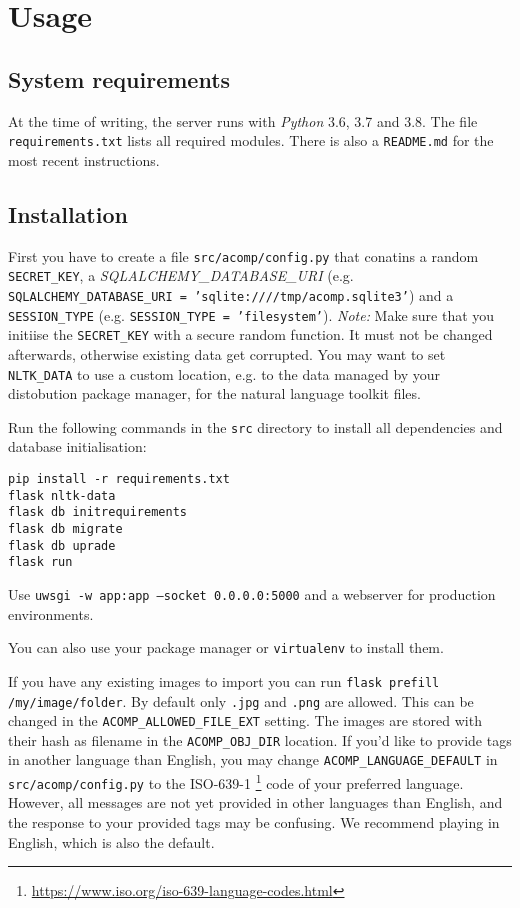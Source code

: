 \section{Usage}
\label{g14:sec:usage}

\subsection{System requirements}
\label{g14:sec:usage:requirements}
At the time of writing, the server runs with \textit{Python} 3.6, 3.7 and 3.8. The file
\texttt{requirements.txt} lists all required modules.
There is also a \texttt{README.md} for the most recent instructions.

\subsection{Installation}
\label{g14:sec:usage:instllation}
First you have to create a file \texttt{src/acomp/config.py} that conatins
a random \texttt{SECRET\_KEY}, a \textit{SQLALCHEMY\_DATABASE\_URI}
(e.g. \texttt{SQLALCHEMY\_DATABASE\_URI = 'sqlite:////tmp/acomp.sqlite3'}) and
a \texttt{SESSION\_TYPE} (e.g. \texttt{SESSION\_TYPE = 'filesystem'}).
\textit{Note:} Make sure that you initiise the \texttt{SECRET\_KEY} with a secure random function.
It must not be changed afterwards, otherwise existing data get corrupted.
You may want to set \texttt{NLTK\_DATA} to use a custom location, e.g. to the data
managed by your distobution package manager, for the natural language toolkit files.

Run the following commands in the \texttt{src} directory to install all dependencies and
database initialisation:

\begin{verbatim}
pip install -r requirements.txt
flask nltk-data
flask db initrequirements
flask db migrate
flask db uprade
flask run
\end{verbatim}

Use \texttt{uwsgi -w app:app --socket 0.0.0.0:5000} and a webserver for production environments.

You can also use your package manager or \texttt{virtualenv} to install them.

If you have any existing images to import you can run
\texttt{flask prefill /my/image/folder}. By default only \texttt{.jpg} and \texttt{.png}
are allowed. This can be changed in the \texttt{ACOMP\_ALLOWED\_FILE\_EXT} setting. The
images are stored with their hash as filename in the \texttt{ACOMP\_OBJ\_DIR} location.
If you'd like to provide tags in another language than English, you may change
\texttt{ACOMP\_LANGUAGE\_DEFAULT} in \texttt{src/acomp/config.py} to the
ISO-639-1 \footnote{\url{https://www.iso.org/iso-639-language-codes.html}} code of your preferred language.
However, all messages are not yet provided in other languages than English,
and the response to your provided tags may be confusing.
We recommend playing in English, which is also the default.

